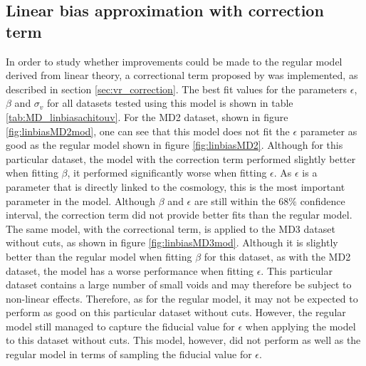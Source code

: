 \subsection{Linear bias approximation with correction term}
In order to study whether improvements could be made to the regular model derived from linear theory, a correctional term proposed by \cite{Achitouv_streaming} was implemented, as described in section \ref{sec:vr_correction}. The best fit values for the parameters $\epsilon$, $\beta$ and $\sigma_v$ for all datasets tested using this model is shown in table \ref{tab:MD_linbiasachitouv}. For the MD2 dataset, shown in figure \ref{fig:linbiasMD2mod}, one can see that this model does not fit the $\epsilon$ parameter as good as the regular model shown in figure \ref{fig:linbiasMD2}. Although for this particular dataset, the model with the correction term performed slightly better when fitting $\beta$, it performed significantly worse when fitting $\epsilon$. As $\epsilon$ is a parameter that is directly linked to the cosmology, this is the most important parameter in the model. Although $\beta$ and $\epsilon$ are still within the $68\%$ confidence interval, the correction term did not provide better fits than the regular model.\\\indent
The same model, with the correctional term, is applied to the MD3 dataset without cuts, as shown in figure \ref{fig:linbiasMD3mod}. Although it is slightly better than the regular model when fitting $\beta$ for this dataset, as with the MD2 dataset, the model has a worse performance when fitting $\epsilon$. This particular dataset contains a large number of small voids and may therefore be subject to non-linear effects. Therefore, as for the regular model, it may not be expected to perform as good on this particular dataset without cuts. However, the regular model still managed to 
capture the fiducial value for $\epsilon$ when applying the model to this dataset without cuts. This model, however, did not perform as well as the regular model in terms of sampling the fiducial value for $\epsilon$.
